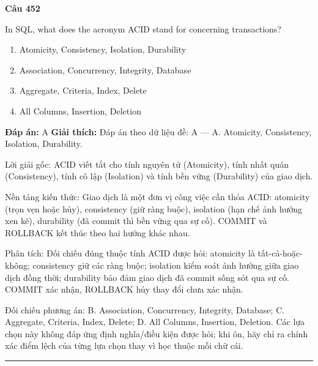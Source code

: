 \documentclass[11pt,a4paper]{article}
\newenvironment{question}[1]{%
  \par\vspace{1em}\noindent\textbf{\large Câu #1}\par\vspace{0.4em}
}{%
  \par\vspace{1em}\hrule\vspace{0.6em}
}
\newenvironment{choices}{%
  \begin{enumerate}[label=\textbf{\Alph*.},leftmargin=2.2em,itemsep=2pt,topsep=3pt]
}{%
  \end{enumerate}
}
\newcommand{\choice}{\item}
\begin{document}
\begin{question}{452}
In SQL, what does the acronym ACID stand for concerning transactions?
\begin{choices}
\choice Atomicity, Consistency, Isolation, Durability
\choice Association, Concurrency, Integrity, Database
\choice Aggregate, Criteria, Index, Delete
\choice All Columns, Insertion, Deletion
\end{choices}
\textbf{Đáp án:} A
\textbf{Giải thích:} Đáp án theo dữ liệu đề: A — A. Atomicity, Consistency, Isolation, Durability.

Lời giải gốc: ACID viết tắt cho tính nguyên tử (Atomicity), tính nhất quán (Consistency), tính cô lập (Isolation) và tính bền vững (Durability) của giao dịch.

Nền tảng kiến thức: Giao dịch là một đơn vị công việc cần thỏa ACID: atomicity (trọn vẹn hoặc hủy), consistency (giữ ràng buộc), isolation (hạn chế ảnh hưởng xen kẽ), durability (đã commit thì bền vững qua sự cố). COMMIT và ROLLBACK kết thúc theo hai hướng khác nhau.

Phân tích: Đối chiếu đúng thuộc tính ACID được hỏi: atomicity là tất-cả-hoặc-không; consistency giữ các ràng buộc; isolation kiểm soát ảnh hưởng giữa giao dịch đồng thời; durability bảo đảm giao dịch đã commit sống sót qua sự cố. COMMIT xác nhận, ROLLBACK hủy thay đổi chưa xác nhận.

Đối chiếu phương án: B. Association, Concurrency, Integrity, Database; C. Aggregate, Criteria, Index, Delete; D. All Columns, Insertion, Deletion. Các lựa chọn này không đáp ứng định nghĩa/điều kiện được hỏi; khi ôn, hãy chỉ ra chính xác điểm lệch của từng lựa chọn thay vì học thuộc mỗi chữ cái.
\end{question}
\end{document}
